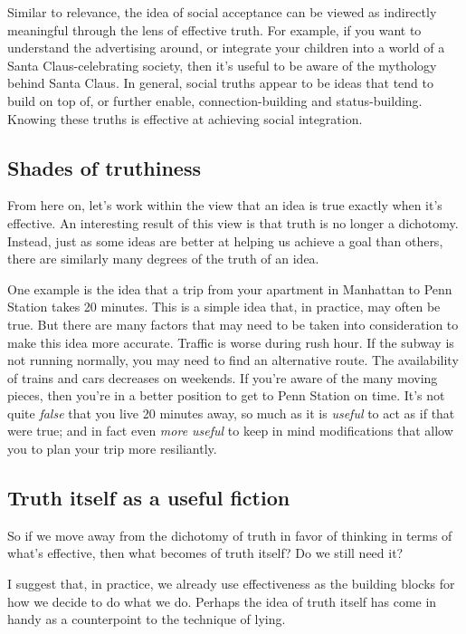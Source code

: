 \documentclass[20pt,]{extarticle}
\begin{document}
Similar to relevance, the idea of social acceptance can be viewed as
indirectly meaningful through the lens of effective truth. For example,
if you want to understand the advertising around, or integrate your
children into a world of a Santa Claus-celebrating society, then it's
useful to be aware of the mythology behind Santa Claus. In general,
social truths appear to be ideas that tend to build on top of, or
further enable, connection-building and status-building. Knowing these
truths is effective at achieving social integration.

\subsection{Shades of truthiness}\label{shades-of-truthiness}

From here on, let's work within the view that an idea is true exactly
when it's effective. An interesting result of this view is that truth is
no longer a dichotomy. Instead, just as some ideas are better at helping
us achieve a goal than others, there are similarly many degrees of the
truth of an idea.

One example is the idea that a trip from your apartment in Manhattan to
Penn Station takes 20 minutes. This is a simple idea that, in practice,
may often be true. But there are many factors that may need to be taken
into consideration to make this idea more accurate. Traffic is worse
during rush hour. If the subway is not running normally, you may need to
find an alternative route. The availability of trains and cars decreases
on weekends. If you're aware of the many moving pieces, then you're in a
better position to get to Penn Station on time. It's not quite
\emph{false} that you live 20 minutes away, so much as it is
\emph{useful} to act as if that were true; and in fact even \emph{more
useful} to keep in mind modifications that allow you to plan your trip
more resiliantly.

\subsection{Truth itself as a useful
fiction}\label{truth-itself-as-a-useful-fiction}

So if we move away from the dichotomy of truth in favor of thinking in
terms of what's effective, then what becomes of truth itself? Do we
still need it?

I suggest that, in practice, we already use effectiveness as the
building blocks for how we decide to do what we do. Perhaps the idea of
truth itself has come in handy as a counterpoint to the technique of
lying.
\end{document}
